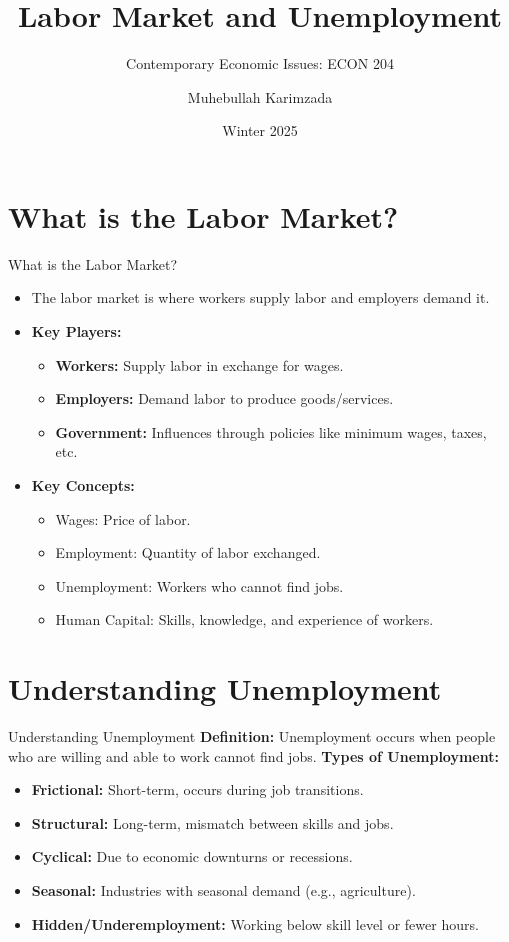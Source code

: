 \documentclass{beamer}
\title[Labor Market and Unemployment]{Labor Market and Unemployment}
\subtitle{Contemporary Economic Issues: ECON 204}
\author{Muhebullah Karimzada}
\date{Winter 2025}
\begin{document}
\begin{frame}
    \titlepage
\end{frame}



\section{What is the Labor Market?}
\begin{frame}{What is the Labor Market?}
    \begin{itemize}
        \item The labor market is where workers supply labor and employers demand it.
        \item \textbf{Key Players:}
        \begin{itemize}
            \item \textbf{Workers:} Supply labor in exchange for wages.
            \item \textbf{Employers:} Demand labor to produce goods/services.
            \item \textbf{Government:} Influences through policies like minimum wages, taxes, etc.
        \end{itemize}
        \item \textbf{Key Concepts:}
        \begin{itemize}
            \item Wages: Price of labor.
            \item Employment: Quantity of labor exchanged.
            \item Unemployment: Workers who cannot find jobs.
            \item Human Capital: Skills, knowledge, and experience of workers.
        \end{itemize}
    \end{itemize}
\end{frame}

\section{Understanding Unemployment}
\begin{frame}{Understanding Unemployment}
    \textbf{Definition:} Unemployment occurs when people who are willing and able to work cannot find jobs.
    \vspace{0.5cm}
    \textbf{Types of Unemployment:}
    \begin{itemize}
        \item \textbf{Frictional:} Short-term, occurs during job transitions.
        \item \textbf{Structural:} Long-term, mismatch between skills and jobs.
        \item \textbf{Cyclical:} Due to economic downturns or recessions.
        \item \textbf{Seasonal:} Industries with seasonal demand (e.g., agriculture).
        \item \textbf{Hidden/Underemployment:} Working below skill level or fewer hours.
    \end{itemize}
\end{frame}
\end{document}
